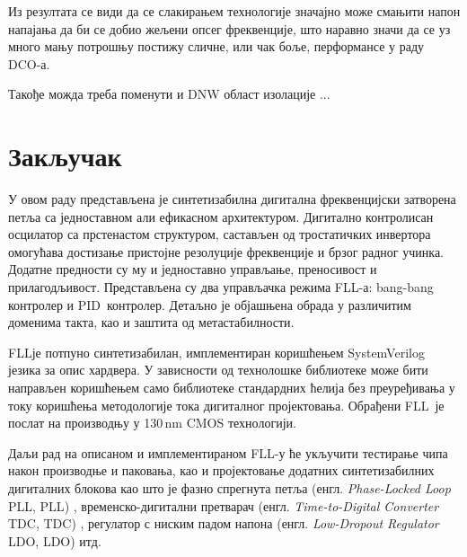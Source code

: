 \documentclass[master]{finthesis}
\makeatletter
\newcommand*{\engl}[2][\@empty]{%
    \edef\theacronym{#1}%
    (енгл. \foreignlanguage{english}{\emph{#2}%
    \ifx\theacronym\@empty \else , #1\fi})%
}
\def \FLL  {FLL} %
\def \DCO  {DCO} %
\def \PID  {PID} %
\makeatother
\begin{document}
Из резултата се види да се слакирањем технологије значајно може смањити напон напајања да би се добио жељени опсег фреквенције, што наравно значи да се уз много мању потрошњу постижу сличне, или чак боље, перформансе у раду \DCO-а. \par
Такође можда треба поменути и DNW област изолације ...






\section{Закључак} \label{Conclusion}
У овом раду представљена је синтетизабилна дигитална фреквенцијски затворена петља са једноставном али ефикасном архитектуром. Дигитално контролисан осцилатор са прстенастом структуром, састављен од тростатичких инвертора омогућава достизање пристојне резолуције фреквенције и брзог радног учинка. Додатне предности су му и једноставно управљање, преносивост и прилагодљивост. Представљена су два управљачка режима \FLL-а: bang-bang контролер и \PID\ контролер. Детаљно је објашњена обрада у различитим доменима такта, као и заштита од метастабилности. \par
\FLL је потпуно синтетизабилан, имплементиран коришћењем SystemVerilog језика за опис хардвера. У зависности од технолошке библиотеке може бити направљен коришћењем само библиотеке стандардних ћелија без преуређивања у току коришћења методологије тока дигиталног пројектовања. Обрађени \FLL\ је послат на производњу у 130\,nm CMOS технологији. \par
Даљи рад на описаном и имплементираном \FLL-у ће укључити тестирање чипа након производње и паковања, као и пројектовање додатних синтетизабилних дигиталних блокова као што је фазно спрегнута петља \engl[PLL]{Phase-Locked Loop}, временско-дигитални претварач \engl[TDC]{Time-to-Digital Converter}, регулатор с ниским падом напона \engl[LDO]{Low-Dropout Regulator} итд.


\makebibliography
\end{document}
